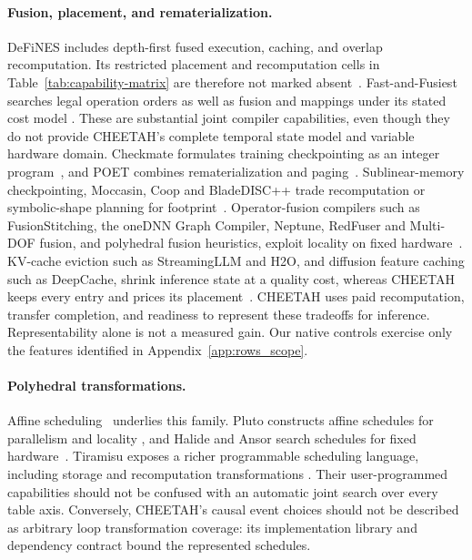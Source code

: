 \paragraph{Fusion, placement, and rematerialization.}
DeFiNES includes depth-first fused execution, caching, and overlap recomputation.
Its restricted placement and recomputation cells in Table~\ref{tab:capability-matrix} are therefore not marked absent~\citep{mei2023defines}.
Fast-and-Fusiest searches legal operation orders as well as fusion and mappings under its stated cost model \citep{andrulis2026fusiest}.
These are substantial joint compiler capabilities, even though they do not provide CHEETAH's complete temporal state model and variable hardware domain.
Checkmate formulates training checkpointing as an integer program~\citep{jain2020checkmatebreakingmemorywall}, and POET combines rematerialization and paging~\citep{patil2022poettrainingneuralnetworks}.
Sublinear-memory checkpointing, Moccasin, Coop and BladeDISC++ trade recomputation or symbolic-shape planning for footprint~\citep{chen2016trainingdeepnetssublinear,bartan2023moccasinefficienttensorrematerialization,zhang2023coopmemorycommodity,yuan2024bladediscmemoryoptimizationsbased}.
Operator-fusion compilers such as FusionStitching, the oneDNN Graph Compiler, Neptune, RedFuser and Multi-DOF fusion, and polyhedral fusion heuristics, exploit locality on fixed hardware~\citep{zheng2021fusionstitchingboostingmemoryintensive,li2024onednngraphcompilerhybrid,zhao2026neptuneadvancedmloperator,Tang_2026,chen_multi_dof,acharya2020fusion}.
KV-cache eviction such as StreamingLLM and H2O, and diffusion feature caching such as DeepCache, shrink inference state at a quality cost, whereas CHEETAH keeps every entry and prices its placement~\citep{xiao2024streamingllm,zhang2023h2o,ma2024deepcache}.
CHEETAH uses paid recomputation, transfer completion, and readiness to represent these tradeoffs for inference.
Representability alone is not a measured gain.
Our native controls exercise only the features identified in Appendix~\ref{app:rows_scope}.

\paragraph{Polyhedral transformations.}
Affine scheduling~\citep{feautrier1992affine} underlies this family.
Pluto constructs affine schedules for parallelism and locality \citep{bondhugula2008pluto}, and Halide and Ansor search schedules for fixed hardware~\citep{ragan2013halide,zheng2023ansorgeneratinghighperformancetensor}.
Tiramisu exposes a richer programmable scheduling language, including storage and recomputation transformations \citep{baghdadi2019tiramisu}.
Their user-programmed capabilities should not be confused with an automatic joint search over every table axis.
Conversely, CHEETAH's causal event choices should not be described as arbitrary loop transformation coverage: its implementation library and dependency contract bound the represented schedules.

